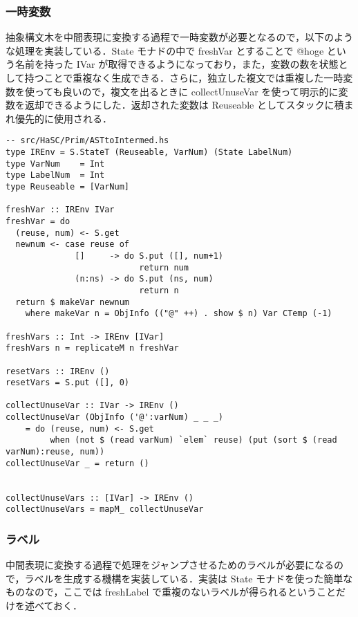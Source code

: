 \documentclass{jsarticle}
\begin{document}
\subsubsection{一時変数}
抽象構文木を中間表現に変換する過程で一時変数が必要となるので，以下のような処理を実装している．State モナドの中で freshVar とすることで @hoge という名前を持った IVar が取得できるようになっており，また，変数の数を状態として持つことで重複なく生成できる．さらに，独立した複文では重複した一時変数を使っても良いので，複文を出るときに collectUnuseVar を使って明示的に変数を返却できるようにした．返却された変数は Reuseable としてスタックに積まれ優先的に使用される．
\begin{verbatim}
-- src/HaSC/Prim/ASTtoIntermed.hs
type IREnv = S.StateT (Reuseable, VarNum) (State LabelNum)
type VarNum    = Int
type LabelNum  = Int
type Reuseable = [VarNum]

freshVar :: IREnv IVar
freshVar = do
  (reuse, num) <- S.get
  newnum <- case reuse of
              []     -> do S.put ([], num+1)
                           return num
              (n:ns) -> do S.put (ns, num)
                           return n
  return $ makeVar newnum
    where makeVar n = ObjInfo (("@" ++) . show $ n) Var CTemp (-1)

freshVars :: Int -> IREnv [IVar]
freshVars n = replicateM n freshVar

resetVars :: IREnv ()
resetVars = S.put ([], 0)

collectUnuseVar :: IVar -> IREnv ()
collectUnuseVar (ObjInfo ('@':varNum) _ _ _)
    = do (reuse, num) <- S.get
         when (not $ (read varNum) `elem` reuse) (put (sort $ (read varNum):reuse, num))
collectUnuseVar _ = return ()


collectUnuseVars :: [IVar] -> IREnv ()
collectUnuseVars = mapM_ collectUnuseVar
\end{verbatim}

\subsubsection{ラベル}
中間表現に変換する過程で処理をジャンプさせるためのラベルが必要になるので，ラベルを生成する機構を実装している．実装は State モナドを使った簡単なものなので，ここでは freshLabel で重複のないラベルが得られるということだけを述べておく．
\end{document}
